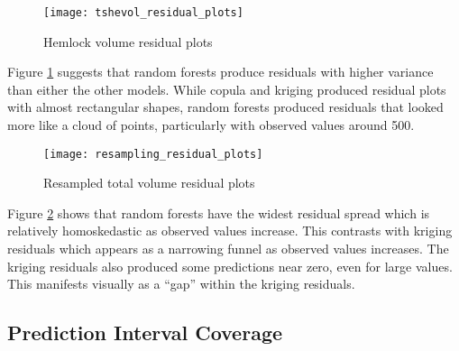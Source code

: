 \documentclass{article}
\begin{document}
\begin{figure}[h]
	\centering
\texttt{[image: tshevol\_residual\_plots]}
\caption{\label{fig:hemlock_resids}Hemlock volume residual plots}
\end{figure}

Figure \ref{fig:hemlock_resids} suggests that random forests produce residuals with higher variance than either the other models.
While copula and kriging produced residual plots with almost rectangular shapes, random forests produced residuals that looked more like a cloud of points, particularly with observed values around 500.

\begin{figure}[h]
	\centering
\texttt{[image: resampling\_residual\_plots]}
\caption{\label{fig:resamp_resids}Resampled total volume residual plots}
\end{figure}

Figure \ref{fig:resamp_resids} shows that random forests have the widest residual spread which is relatively homoskedastic as observed values increase.
This contrasts with kriging residuals which appears as a narrowing funnel as observed values increases.
The kriging residuals also produced some predictions near zero, even for large values.
This manifests visually as a ``gap'' within the kriging residuals.

\subsection{Prediction Interval Coverage}
\end{document}
